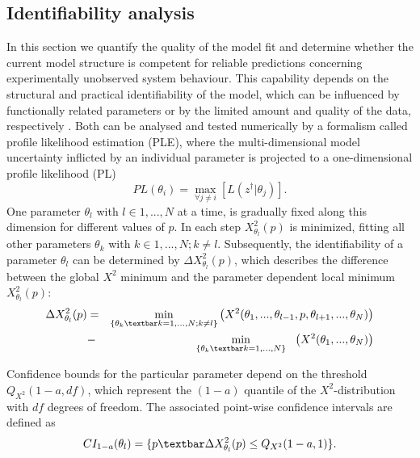 \subsection{Identifiability analysis}
\label{sec:identifiabilityAnalysis}
In this section we quantify the quality of the model fit and determine whether the current model structure is competent for reliable predictions concerning experimentally unobserved system behaviour. This capability depends on the structural and practical identifiability of the model, which can be influenced by functionally related parameters or by the limited amount and quality of the data, respectively \cite{Cobelli1980,Swameye2003}. Both can be analysed and tested numerically by a formalism called profile likelihood estimation (PLE)\cite{Venzon1988,Murphy2000,Raue2009}, where the multi-dimensional model uncertainty inflicted by an individual parameter is projected to a one-dimensional profile likelihood (PL)
\begin{equation}
PL(\theta_i) = \max_{\forall j \neq i} [L(z^\dag \lvert \theta_j)].
\label{eqn:PL} 
\end{equation}
One parameter $\theta_l$ with $l\in{1,...,N}$ at a time, is gradually fixed along this dimension for different values of $p$. In each step $X_{\theta_l}^2(p)$ is minimized, fitting all other parameters $\theta_k$ with $k\in{1,...,N};k\neq l$. Subsequently, the identifiability of a parameter $\theta_l$ can be determined by $\Delta X_{\theta_l}^2(p)$, which describes the difference between the global $X^2$ minimum and the parameter dependent local minimum $X_{\theta_l}^2(p)$:
\begin{eqnarray}
	\Delta X_{\theta_l}^2(p) &=& \min_{\{\theta_k\textbar k=1,...,N;k\neq l\}} \left( X^2 (\theta_1,...,\theta_{l-1},p,\theta_{l+1},...,\theta_N )\right)\nonumber \\
	&-& \quad \! \min_{\{\theta_k\textbar k=1,...,N\}} \quad \!\! \left( X^2 (\theta_1,...,\theta_N )\right)
\end{eqnarray}  

Confidence bounds for the particular parameter depend on the threshold $Q_{X^2}(1-a,df)$, which represent the $(1-a)$ quantile of the $X^2$-distribution with $df$ degrees of freedom. The associated point-wise confidence intervals are defined as
\begin{equation}
CI_{1-a}(\theta_l)= \{p\textbar \Delta X_{\theta_l}^2(p)\leq Q_{X^2}(1-a,1)\}.
\label{eqn:confidenceIntervals}
\end{equation} 

